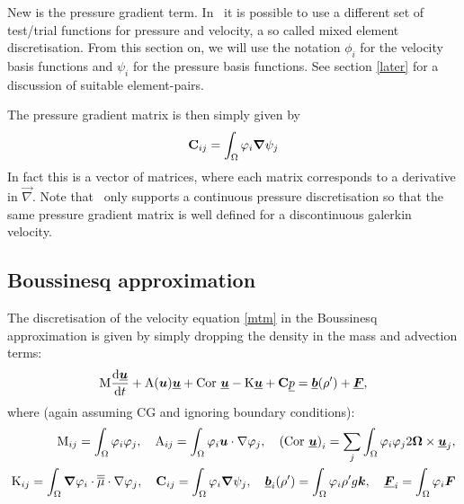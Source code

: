 New is the pressure gradient term. In \fluidity\ it is possible 
to use a different set of test/trial functions for pressure 
and velocity, a so called mixed element discretisation. From this section 
on, we will use the notation $\phi_i$ for the velocity 
basis functions and $\psi_i$ for the pressure basis functions.
See section \ref{later} for a discussion of suitable element-pairs.

The pressure gradient matrix is then simply given by
\begin{equation}
  {\mbox{\boldmath$\mathrm{C}$}}_{ij}=\int_\Omega \varphi_i{\mbox{\boldmath$\nabla$}}\psi_j \label{pgmatrix}
\end{equation}
In fact this is a vector of matrices, where each matrix corresponds
to a derivative in $\vec\nabla$. Note that \fluidity\ only supports
a continuous pressure discretisation so that the same 
pressure gradient matrix is well defined for a discontinuous galerkin 
velocity.

\subsection{Boussinesq approximation}
The discretisation of the velocity equation \eqref{mtm} 
in the Boussinesq approximation is given by simply 
dropping the density in the mass and advection terms:
\begin{equation*}
  \mathrm{M} \frac{\mathrm{d}\underline{{\mbox{\boldmath$u$}}}}{\mathrm{d} t}
    +\mathrm{A}({\mbox{\boldmath$u$}})\underline{{\mbox{\boldmath$u$}}}
    +\mathrm{Cor}~\underline{{\mbox{\boldmath$u$}}}
    -\mathrm{K}\underline{{\mbox{\boldmath$u$}}}    
    +{\mbox{\boldmath$\mathrm{C}$}} \underline{p}
    =\underline{{\mbox{\boldmath$b$}}}(\rho')+\underline{{\mbox{\boldmath$F$}}},
\end{equation*}
where (again assuming CG and ignoring boundary conditions):
\begin{equation*}
\begin{split}
  \mathrm{M}_{ij}=\int_\Omega \varphi_i\varphi_j, \quad
  \mathrm{A}_{ij}=\int_\Omega \varphi_i{\mbox{\boldmath$u$}}\cdot\nabla \varphi_j, \quad
  \left(\mathrm{Cor}~\underline{{\mbox{\boldmath$u$}}}\right)_i
    =\sum_j\int_\Omega \varphi_i \varphi_j 2{\mbox{\boldmath$\Omega$}}\times\underline{{\mbox{\boldmath$u$}}}_j, \\
  \mathrm{K}_{ij}=\int_\Omega {\mbox{\boldmath$\nabla$}}\varphi_i\cdot \overline{\overline{\mu}}\cdot\nabla \varphi_j, \quad
  {\mbox{\boldmath$\mathrm{C}$}}_{ij}=\int_\Omega \varphi_i{\mbox{\boldmath$\nabla$}}\psi_j, \quad
    \underline{{\mbox{\boldmath$b$}}}_i(\rho')=\int_\Omega \varphi_i\rho'g{\mbox{\boldmath$k$}},\quad
    \underline{{\mbox{\boldmath$F$}}}_i=\int_\Omega \varphi_i{\mbox{\boldmath$F$}}
\end{split}
\end{equation*}

